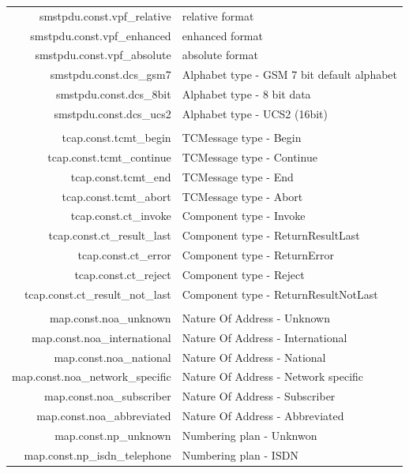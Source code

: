 \documentclass[a4paper,latin]{paper}
\begin{document}
\noindent\begin{tabularx}{\linewidth}{ | >{\ttfamily} r | >{\ttfamily} X |}
	\hline
	smstpdu.const.vpf\_relative			& relative format\\
	smstpdu.const.vpf\_enhanced			& enhanced format\\
	smstpdu.const.vpf\_absolute			& absolute format\\
	smstpdu.const.dcs\_gsm7				& Alphabet type - GSM 7 bit default alphabet\\
	smstpdu.const.dcs\_8bit				& Alphabet type - 8 bit data\\
	smstpdu.const.dcs\_ucs2				& Alphabet type - UCS2 (16bit)\\
	\hline
	\rowcolor{blue!10}
	\multicolumn{2}{| l |}{\acrfull{tcap}} 		\\
	\hline
	tcap.const.tcmt\_begin				& TCMessage type - Begin\\
	tcap.const.tcmt\_continue			& TCMessage type - Continue\\
	tcap.const.tcmt\_end				& TCMessage type - End\\
	tcap.const.tcmt\_abort				& TCMessage type - Abort\\
	tcap.const.ct\_invoke				& Component type - Invoke\\
	tcap.const.ct\_result\_last			& Component type - ReturnResultLast\\
	tcap.const.ct\_error				& Component type - ReturnError\\
	tcap.const.ct\_reject				& Component type - Reject\\
	tcap.const.ct\_result\_not\_last		& Component type - ReturnResultNotLast\\
	\hline
	\rowcolor{blue!10}
	\multicolumn{2}{| l |}{\acrfull{map}} 		\\
	\hline
	map.const.noa\_unknown				& Nature Of Address - Unknown\\
	map.const.noa\_international			& Nature Of Address - International\\
	map.const.noa\_national				& Nature Of Address - National\\
	map.const.noa\_network\_specific		& Nature Of Address - Network specific\\
	map.const.noa\_subscriber			& Nature Of Address - Subscriber\\
	map.const.noa\_abbreviated			& Nature Of Address - Abbreviated\\
	map.const.np\_unknown				& Numbering plan - Unknwon\\
	map.const.np\_isdn\_telephone			& Numbering plan - ISDN\\

\end{tabularx}
\end{document}
